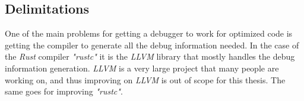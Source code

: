 






\subsection{Delimitations}





One of the main problems for getting a debugger to work for optimized code is getting the compiler to generate all the debug information needed.
In the case of the \emph{Rust} compiler \emph{"rustc"}  it is the \emph{LLVM} library that mostly handles the debug information generation.
\emph{LLVM} is a very large project that many people are working on, and thus improving on \emph{LLVM} is out of scope for this thesis.
The same goes for improving \emph{"rustc"}.


